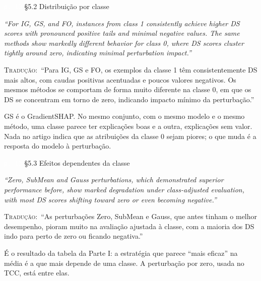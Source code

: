 \documentclass[11pt,a4paper]{article}
\newcommand{\pagechip}[1]{{\setlength{\fboxsep}{1.5pt}\colorbox{cAcc}{\textcolor{white}{\scriptsize\texttt{#1}}}}}
\newenvironment{origquote}{\par\itshape\small}{\par}
\newenvironment{tradquote}{\par\small\textsc{Tradução:}\ }{\par}
\newcommand{\explab}[1]{\par\smallskip{\small\color{cAcc}\textbf{\MakeUppercase{#1}}}\par}
\begin{document}
\begin{citacard}{\pagechip{p. 13} §5.2 Distribuição por classe}
\begin{origquote}“For IG, GS, and FO, instances from class 1 consistently achieve higher DS scores with pronounced positive tails and minimal negative values. The same methods show markedly different behavior for class 0, where DS scores cluster tightly around zero, indicating minimal perturbation impact.”\end{origquote}
\begin{tradquote}“Para IG, GS e FO, os exemplos da classe 1 têm consistentemente DS mais altos, com caudas positivas acentuadas e poucos valores negativos. Os mesmos métodos se comportam de forma muito diferente na classe 0, em que os DS se concentram em torno de zero, indicando impacto mínimo da perturbação.”\end{tradquote}
\explab{Explicação}
GS é o GradientSHAP. No mesmo conjunto, com o mesmo modelo e o mesmo método, uma classe parece ter explicações boas e a outra, explicações sem valor. Nada no artigo indica que as atribuições da classe 0 sejam piores; o que muda é a resposta do modelo à perturbação.
\end{citacard}

\begin{citacard}{\pagechip{p. 13} §5.3 Efeitos dependentes da classe}
\begin{origquote}“Zero, SubMean and Gauss perturbations, which demonstrated superior performance before, show marked degradation under class-adjusted evaluation, with most DS scores shifting toward zero or even becoming negative.”\end{origquote}
\begin{tradquote}“As perturbações Zero, SubMean e Gauss, que antes tinham o melhor desempenho, pioram muito na avaliação ajustada à classe, com a maioria dos DS indo para perto de zero ou ficando negativa.”\end{tradquote}
\explab{Explicação}
É o resultado da tabela da Parte I: a estratégia que parece “mais eficaz” na média é a que mais depende de uma classe. A perturbação por zero, usada no TCC, está entre elas.
\end{citacard}
\end{document}
